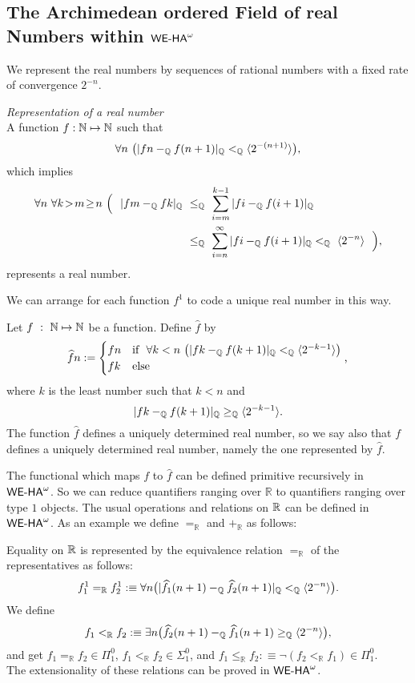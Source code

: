 \subsection{The Archimedean ordered Field of real Numbers within ${\textsf{\upshape WE-HA}}^{\omega}$}
%
We represent the real numbers by sequences of rational numbers with
a fixed rate of convergence $2^{-n}$. 
\begin{dfn}{\em Representation of a real number\\}\label{d:real}
A function $f : \mathbb{N} \mapsto \mathbb{N}$ such that
\[
  \forall n\ \big(|fn -_{\mathbb{Q}} f(n+1)|_{\mathbb{Q}} <_{\mathbb{Q}} \langle 2^{-(n+1)}  \rangle\big)
\text{,}
\]
which implies
\begin{align*}
  \forall n\ \forall k\!>\!m\!\geq\!n\ \Big(\ \
    |fm -_{\mathbb{Q}} fk|_{\mathbb{Q}}\  &\leq_{\mathbb{Q}}\  \sum^{k-1}_{i =m}|fi-_{\mathbb{Q}} f(i+1)|_{\mathbb{Q}} \\
                       &\leq_{\mathbb{Q}}\  \sum^{\infty}_{i =n}|fi -_{\mathbb{Q}} f(i+1) |_{\mathbb{Q}}
                       <_{\mathbb{Q}}\ \langle 2^{-n} \rangle\ \ \Big)\text{,}
\end{align*}
represents a real number.
\end{dfn}
We can arrange for each function $f^1$ to code a unique real number in this way.
\begin{dfn} \label{d:hatReal}
Let $f\ :\ \mathbb{N}\mapsto\mathbb{N}$ be a function. Define $\widehat{\!f}$ by   
\[
\widehat{\!f}n := 
  \begin{cases}
    fn & \text{if}\ \ \forall k<n\ \big(|fk -_{\mathbb{Q}} f(k+1)|_{\mathbb{Q}} <_{\mathbb{Q}} \langle 2^{-k-1}\rangle\big) \\
    fk & \text{else}
  \end{cases}\text{,}
\]
where $k$ is the least number such that $k<n$ 
and  \[|fk-_{\mathbb{Q}} f(k+1)|_{\mathbb{Q}} \geq_{\mathbb{Q}} \langle 2^{-k-1} \rangle\text{.}\]
The function $\widehat{\!f}$ defines a uniquely determined real number, so
we say also that $f$ defines a uniquely determined real number, namely the one represented 
by $\widehat{\!f}$.
\end{dfn}
The functional which maps $f$ to $\widehat{\!f}$ can be defined primitive 
recursively in ${\textsf{\upshape WE-HA}}^{\omega}$. So we can reduce quantifiers ranging over
$\mathbb{R}$ to quantifiers ranging over type $1$ objects. 
The usual operations and relations on $\mathbb{R}$ can be defined in ${\textsf{\upshape WE-HA}}^{\omega}$. As an
example we define $=_{\mathbb{R}}$ and $+_{\mathbb{R}}$ as follows:
\begin{dfn}\label{d:Rel}
Equality on $\mathbb{R}$ is represented by the equivalence relation $=_{\mathbb{R}}$
 of the representatives as follows:
        \[
            f_{1}^{1} =_{\mathbb{R}} f_{2}^{1} : \equiv \forall n
            \big(|\widehat{f_{1}}(n+1) -_{\mathbb{Q}}
            \widehat{f_{2}}(n+1)|_{\mathbb{Q}} <_{\mathbb{Q}} \langle
                                           2^{-n} \rangle \big).
        \]
We define
       \[
       f_{1} <_{\mathbb{R}} f_{2} : \equiv \exists n
            \big(\widehat{f_{2}}(n+1) -_{\mathbb{Q}}
            \widehat{f_{1}}(n+1) \geq_{\mathbb{Q}} \langle
                                           2^{-n} \rangle  \big),
       \]
and get $f_{1} =_{\mathbb{R}} f_{2} \in \Pi^{0}_{1}$, $f_{1}
<_{\mathbb{R}} f_{2} \in \Sigma^{0}_{1}$, and $f_{1}
\leq_{\mathbb{R}} f_{2} : \equiv \lnot( f_{2} <_{\mathbb{R}} f_{1} )
\in \Pi^{0}_{1}$.\\
The extensionality of these relations can be proved in ${\textsf{\upshape WE-HA}}^{\omega}$.
\end{dfn}
